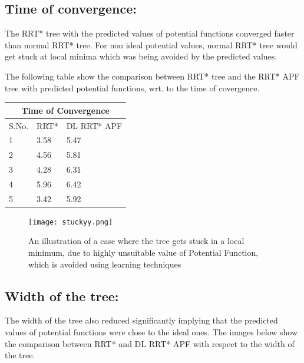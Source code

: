 \documentclass[runningheads]{llncs}
\begin{document}
\subsection{Time of convergence:}
The RRT* tree with the predicted values of potential functions converged faster than normal RRT* tree. For non ideal potential values, normal RRT* tree would get stuck at local minima which was being avoided by the predicted values.

The following table show the comparison between RRT* tree and the RRT* APF tree with predicted potential functions, wrt. to the time of covergence.

\vspace{10mm}
\begin{center}
\begin{tabular}{ |p{1cm}||p{3cm}|p{3cm}|  }
 \hline
 \multicolumn{3}{|c|}{Time of Convergence} \\
 \hline
 S.No. & RRT* &DL RRT* APF\\
 \hline
 1   & 3.58    &5.47\\
 2&   4.56  & 5.81   \\
 3 &4.28 & 6.31\\
 4    &5.96 & 6.42\\
 5&   3.42 & 5.92 \\

 \hline
\end{tabular}
\end{center}



\begin{figure}
\begin{center}
\texttt{[image: stuckyy.png]}
    \caption{ An illustration of a case where the tree gets stuck in a local minimum, due to highly unsuitable value of Potential Function, which is avoided using learning techniques}\label{fig1}
\end{center}
\end{figure}

\subsection{Width of the tree:}
The width of the tree also reduced significantly implying that the predicted values of potential functions were close to the ideal ones. The images below show the comparison between RRT* and DL RRT* APF with respect to the width of the tree.
\end{document}
